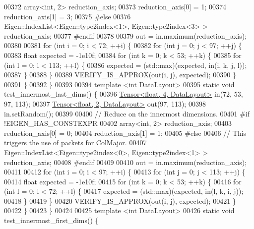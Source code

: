 \begin{DoxyCode}
00372   array<int, 2> reduction\_axis;
00373   reduction\_axis[0] = 1;
00374   reduction\_axis[1] = 3;
00375 \textcolor{preprocessor}{#else}
00376   Eigen::IndexList<Eigen::type2index<1>, Eigen::type2index<3> > reduction\_axis;
00377 \textcolor{preprocessor}{#endif}
00378 
00379   out = in.maximum(reduction\_axis);
00380 
00381   \textcolor{keywordflow}{for} (\textcolor{keywordtype}{int} i = 0; i < 72; ++i) \{
00382     \textcolor{keywordflow}{for} (\textcolor{keywordtype}{int} j = 0; j < 97; ++j) \{
00383       \textcolor{keywordtype}{float} expected = -1e10f;
00384       \textcolor{keywordflow}{for} (\textcolor{keywordtype}{int} k = 0; k < 53; ++k) \{
00385         \textcolor{keywordflow}{for} (\textcolor{keywordtype}{int} l = 0; l < 113; ++l) \{
00386           expected = (std::max)(expected, in(i, k, j, l));
00387         \}
00388       \}
00389       VERIFY\_IS\_APPROX(out(i, j), expected);
00390     \}
00391   \}
00392 \}
00393 
00394 \textcolor{keyword}{template} <\textcolor{keywordtype}{int} DataLayout>
00395 \textcolor{keyword}{static} \textcolor{keywordtype}{void} test\_innermost\_last\_dims() \{
00396   \hyperlink{class_eigen_1_1_tensor}{Tensor<float, 4, DataLayout>} in(72, 53, 97, 113);
00397   \hyperlink{class_eigen_1_1_tensor}{Tensor<float, 2, DataLayout>} out(97, 113);
00398   in.setRandom();
00399 
00400 \textcolor{comment}{// Reduce on the innermost dimensions.}
00401 \textcolor{preprocessor}{#if !EIGEN\_HAS\_CONSTEXPR}
00402   array<int, 2> reduction\_axis;
00403   reduction\_axis[0] = 0;
00404   reduction\_axis[1] = 1;
00405 \textcolor{preprocessor}{#else}
00406   \textcolor{comment}{// This triggers the use of packets for ColMajor.}
00407   Eigen::IndexList<Eigen::type2index<0>, Eigen::type2index<1> > reduction\_axis;
00408 \textcolor{preprocessor}{#endif}
00409 
00410   out = in.maximum(reduction\_axis);
00411 
00412   \textcolor{keywordflow}{for} (\textcolor{keywordtype}{int} i = 0; i < 97; ++i) \{
00413     \textcolor{keywordflow}{for} (\textcolor{keywordtype}{int} j = 0; j < 113; ++j) \{
00414       \textcolor{keywordtype}{float} expected = -1e10f;
00415       \textcolor{keywordflow}{for} (\textcolor{keywordtype}{int} k = 0; k < 53; ++k) \{
00416         \textcolor{keywordflow}{for} (\textcolor{keywordtype}{int} l = 0; l < 72; ++l) \{
00417           expected = (std::max)(expected, in(l, k, i, j));
00418         \}
00419       \}
00420       VERIFY\_IS\_APPROX(out(i, j), expected);
00421     \}
00422   \}
00423 \}
00424 
00425 \textcolor{keyword}{template} <\textcolor{keywordtype}{int} DataLayout>
00426 \textcolor{keyword}{static} \textcolor{keywordtype}{void} test\_innermost\_first\_dims() \{

\end{DoxyCode}
